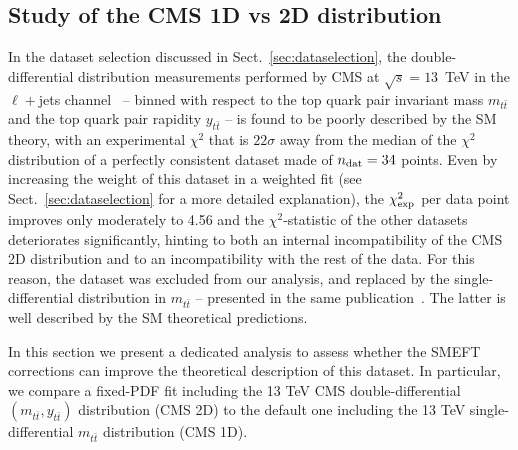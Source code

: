 \documentclass[withindex,glossary]{cam-thesis}
\begin{document}
\subsection{Study of the CMS 1D vs 2D distribution}
\label{subsec:cms1dvs2d}
In the dataset selection discussed in Sect.~\ref{sec:dataselection}, 
the double-differential distribution measurements performed by CMS at $\sqrt{s}=13$~TeV
in the $\ell+$jets channel~\cite{CMS:2021vhb} -- binned with respect to the top
quark pair invariant mass $m_{t\bar{t}}$ and the top quark pair rapidity $y_{t\bar{t}}$ -- is found to be poorly described by the
SM theory, with an experimental $\chi^2$ that is $22\sigma$ 
away from the median of the $\chi^2$ distribution of a
perfectly consistent dataset made of $n_{\rm dat}=34$ points.
Even by increasing the weight of this dataset in a weighted fit (see Sect.~\ref{sec:dataselection} for a more
detailed explanation), the $\chi^2_{\rm exp}$ per data point improves
only moderately to 4.56 and the  $\chi^2$-statistic of the other datasets deteriorates significantly, hinting
to both an internal incompatibility of the CMS 2D distribution and to an incompatibility with the rest of the data. 
For this reason, the dataset was excluded from our analysis, and replaced by the single-differential
distribution in $m_{t\bar{t}}$ -- presented in the same publication~\cite{CMS:2021vhb}. The latter is well 
described by the SM theoretical predictions. 

 In this section we present a dedicated analysis to assess whether the SMEFT corrections can improve the
 theoretical description of this dataset. In particular, we compare a fixed-PDF fit including the 13 TeV
 CMS double-differential $(m_{t\bar{t}},y_{t\bar{t}})$  distribution (CMS 2D)
 to the default one including the 13 TeV single-differential $m_{t\bar{t}}$ distribution (CMS 1D).
\end{document}
